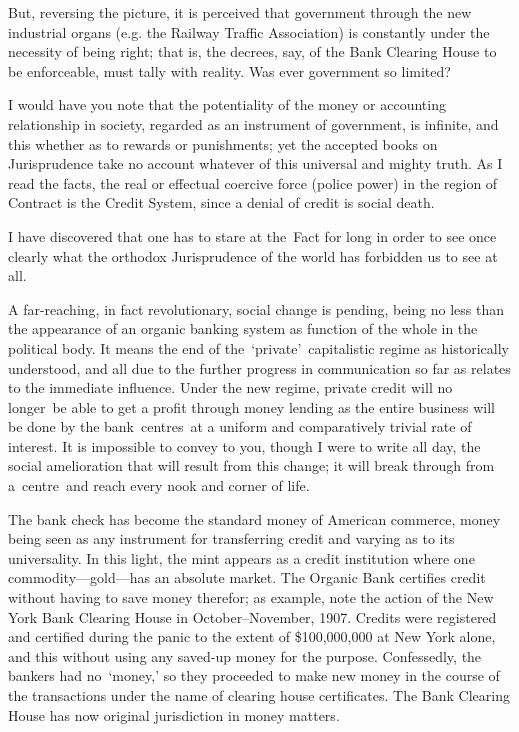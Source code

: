 \documentclass[twoside,symmetric,nobib,justified]{tufte-book}
\begin{document}
But, reversing the picture, it is perceived that government through the
new industrial organs (e.g. the Railway Traffic Association) is
constantly under the necessity of being right; that is, the decrees,
say, of the Bank Clearing House to be enforceable, must tally with
reality. Was ever government so limited?~

I would have you note that the potentiality of the money or accounting
relationship in society, regarded as an instrument of government, is
infinite, and this whether as to rewards or punishments; yet the
accepted books on Jurisprudence take no account whatever of this
universal and mighty truth. As I read the facts, the real or effectual
coercive force (police power) in the region of Contract is the Credit
System, since a denial of credit is social death.~

I have discovered that one has to stare at the~Fact for long in order to
see once clearly what the orthodox Jurisprudence of the world has
forbidden us to see at all.~

A far-reaching, in fact revolutionary, social change is pending, being
no less than the appearance of an organic banking system as function of
the whole in the political body. It means the end of
the~`private'~capitalistic regime as historically understood, and all
due to the further progress in communication so far as relates to the
immediate influence. Under the new regime, private credit will no
longer~be able to get a profit through \textquotesingle money
lending\textquotesingle{} as the entire business will be done by the
bank~centres~at a uniform and comparatively trivial rate of interest. It
is impossible to convey to you, though I were to write all day, the
social amelioration that will result from this change; it will break
through from a~centre~and reach every nook and corner of life.~

The bank check has become the standard money of American commerce, money
being seen as any instrument for transferring credit and varying as to
its universality. In this light, the mint appears as a credit
institution where one commodity---gold---has an absolute market. The
Organic Bank certifies credit without having to save
\textquotesingle money\textquotesingle{} therefor; as example, note the
action of the New York Bank Clearing House in October--November, 1907.
Credits were registered and certified during the panic to the extent of
\$100,000,000 at New York alone, and this without using any saved-up
money for the purpose. Confessedly, the bankers had no~`money,' so they
proceeded to make new money in the course of the transactions under the
name of clearing house certificates. The Bank Clearing House has now
original jurisdiction in money matters.~
\end{document}
